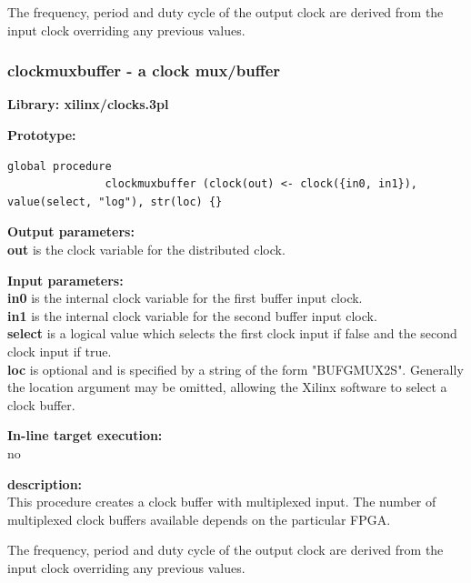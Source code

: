             The frequency, period and duty cycle of the output clock are
            derived from the input clock overriding any previous values.



        \subsubsection{clockmuxbuffer - a clock mux/buffer}\label{sec:lpclockmuxbuffer}
            
            {\bf Library: xilinx/clocks.3pl}

            {\bf Prototype:} \\
            \vsp
            \begin{lstlisting}[gobble=12, language=threepl]
               global procedure
               clockmuxbuffer (clock(out) <- clock({in0, in1}), value(select, "log"), str(loc) {}
            \end{lstlisting}

            {\bf Output parameters:} \\
            {\bf out} is the clock variable for the distributed clock.

            {\bf Input parameters:} \\            
            {\bf in0} is the internal clock variable for the first buffer input
            clock.\\
            {\bf in1} is the internal clock variable for the second buffer input
            clock.\\
            {\bf select} is a logical value which selects the first clock
            input if false and the second clock input if true.\\
            {\bf loc} is optional and is specified by a string of the form
            "BUFGMUX2S". Generally the location argument may be omitted,
            allowing the Xilinx software to select a clock buffer.
        
            {\bf In-line target execution:} \\
            no

            {\bf description:} \\
            This procedure creates a clock buffer with multiplexed input. The
            number of multiplexed clock buffers available depends on the
            particular FPGA.
            
            The frequency, period and duty cycle of the output clock are
            derived from the input clock overriding any previous values.




